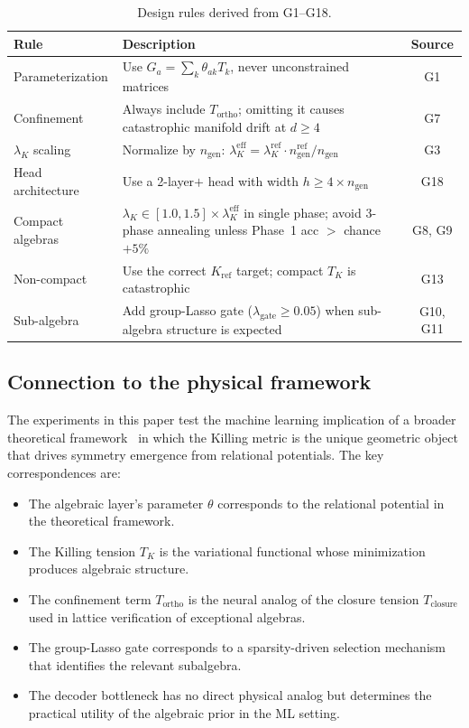 \documentclass[11pt,a4paper]{article}
\newcommand{\TK}{T_K}
\newcommand{\Tortho}{T_{\mathrm{ortho}}}
\newcommand{\Tclosure}{T_{\mathrm{closure}}}
\newcommand{\ngen}{n_{\mathrm{gen}}}
\theoremstyle{definition}
\begin{document}
\begin{table}[H]
\centering
\caption{Design rules derived from G1--G18.}
\label{tab:design_rules}
\begin{tabularx}{\textwidth}{lXc}
\toprule
Rule & Description & Source \\
\midrule
Parameterization & Use $G_a = \sum_k \theta_{ak} T_k$, never 
  unconstrained matrices & G1 \\
Confinement & Always include $\Tortho$; omitting it causes catastrophic 
  manifold drift at $d \geq 4$ & G7 \\
$\lambda_K$ scaling & Normalize by $\ngen$: 
  $\lambda_K^{\mathrm{eff}} = \lambda_K^{\mathrm{ref}} 
  \cdot \ngen^{\mathrm{ref}} / \ngen$ & G3 \\
Head architecture & Use a 2-layer$+$ head with width 
  $h \geq 4 \times \ngen$ & G18 \\
Compact algebras & $\lambda_K \in [1.0, 1.5] \times \lambda_K^{\mathrm{eff}}$ 
  in single phase; avoid 3-phase annealing unless Phase~1 
  acc $>$ chance $+ 5\%$ & G8, G9 \\
Non-compact & Use the correct $K_{\mathrm{ref}}$ target; compact $\TK$ 
  is catastrophic & G13 \\
Sub-algebra & Add group-Lasso gate ($\lambda_{\mathrm{gate}} \geq 0.05$) 
  when sub-algebra structure is expected & G10, G11 \\
\bottomrule
\end{tabularx}
\end{table}


\subsection{Connection to the physical framework}
\label{sec:physics}

The experiments in this paper test the machine learning implication of a 
broader theoretical framework~\cite{moreno2026relational} in which the 
Killing metric is the unique geometric object that drives symmetry 
emergence from relational potentials. The key correspondences are:

\begin{itemize}[nosep]
  \item The algebraic layer's parameter $\theta$ corresponds to the 
    relational potential in the theoretical framework.
  \item The Killing tension $\TK$ is the variational functional whose 
    minimization produces algebraic structure.
  \item The confinement term $\Tortho$ is the neural analog of the 
    closure tension $\Tclosure$ used in lattice verification of 
    exceptional algebras.
  \item The group-Lasso gate corresponds to a sparsity-driven selection 
    mechanism that identifies the relevant subalgebra.
  \item The decoder bottleneck has no direct physical analog but 
    determines the practical utility of the algebraic prior in the 
    ML setting.
\end{itemize}
\end{document}
